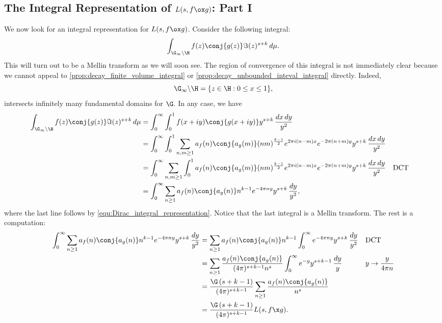     \subsection*{The Integral Representation of \texorpdfstring{$L(s,f \ox g)$}{L(s,f \ox g)}: Part I}
      We now look for an integral representation for $L(s,f \ox g)$. Consider the following integral:
      \[
        \int_{\G_{\infty}\backslash\H}f(z)\conj{g(z)}\Im(z)^{s+k}\,d\mu.
      \]
      This will turn out to be a Mellin transform as we will soon see. The region of convergence of this integral is not immediately clear because we cannot appeal to \cref{prop:decay_finite_volume_integral} or \cref{prop:decay_unbounded_inteval_integral} directly. Indeed,
      \[
        \G_{\infty}\backslash\H = \{z \in \H:0 \le x \le 1\},
      \]
      intersects infinitely many fundamental domains for $\G$. In any case, we have
      \begin{align*}
        \int_{\G_{\infty}\backslash\H}f(z)\conj{g(z)}\Im(z)^{s+k}\,d\mu &= \int_{0}^{\infty}\int_{0}^{1}f(x+iy)\conj{g(x+iy)}y^{s+k}\,\frac{dx\,dy}{y^{2}} \\
        &= \int_{0}^{\infty}\int_{0}^{1}\sum_{n,m \ge 1}a_{f}(n)\conj{a_{g}(m)}(nm)^{\frac{k-1}{2}}e^{2\pi i(n-m)x}e^{-2\pi(n+m)y}y^{s+k}\,\frac{dx\,dy}{y^{2}} \\
        &= \int_{0}^{\infty}\sum_{n,m \ge 1}\int_{0}^{1}a_{f}(n)\conj{a_{g}(m)}(nm)^{\frac{k-1}{2}}e^{2\pi i(n-m)x}e^{-2\pi(n+m)y}y^{s+k}\,\frac{dx\,dy}{y^{2}} && \text{DCT} \\
        &= \int_{0}^{\infty}\sum_{n \ge 1}a_{f}(n)\conj{a_{g}(n)}n^{k-1}e^{-4\pi ny}y^{s+k}\,\frac{dy}{y^{2}},
      \end{align*}
      where the last line follows by \cref{equ:Dirac_integral_representation}. Notice that the last integral is a Mellin transform. The rest is a computation:
      \begin{align*}
        \int_{0}^{\infty}\sum_{n \ge 1}a_{f}(n)\conj{a_{g}(n)}n^{k-1}e^{-4\pi ny}y^{s+k}\,\frac{dy}{y^{2}} &= \sum_{n \ge 1}a_{f}(n)\conj{a_{g}(n)}n^{k-1}\int_{0}^{\infty}e^{-4\pi ny}y^{s+k}\,\frac{dy}{y^{2}} &&\text{DCT} \\
        &= \sum_{n \ge 1}\frac{a_{f}(n)\conj{a_{g}(n)}}{(4\pi)^{s+k-1}n^{s}}\int_{0}^{\infty}e^{-y}y^{s+k-1}\,\frac{dy}{y} &&\text{$y \to \frac{y}{4\pi n}$} \\
        &= \frac{\G\left(s+k-1\right)}{(4\pi)^{s+k-1}}\sum_{n \ge 1}\frac{a_{f}(n)\conj{a_{g}(n)}}{n^{s}} \\
        &= \frac{\G\left(s+k-1\right)}{(4\pi)^{s+k-1}}L(s,f \x g).
      \end{align*}

